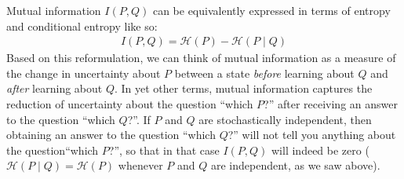 \documentclass[nobib,nofonts]{tufte-handout}
\begin{document}
Mutual information $I(P,Q)$ can be equivalently expressed in terms of entropy and conditional entropy like so:
\begin{align*}
  I(P,Q) = \mathcal{H}(P) - \mathcal{H}(P \mid Q)
\end{align*}
Based on this reformulation, we can think of mutual information as a measure of the change in uncertainty about $P$ between a state \emph{before} learning about $Q$ and \emph{after} learning about $Q$.
In yet other terms, mutual information captures the reduction of uncertainty about the question ``which $P$?'' after receiving an answer to the question ``which $Q$?''.
If $P$ and $Q$ are stochastically independent, then obtaining an answer to the question ``which $Q$?'' will not tell you anything about the question``which $P$?'', so that in that case $I(P,Q)$ will indeed be zero ($\mathcal{H}(P \mid Q) = \mathcal{H}(P)$ whenever $P$ and $Q$ are independent, as we saw above).
\end{document}
